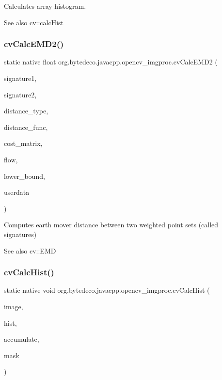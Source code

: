 Calculates array histogram. 

\begin{DoxySeeAlso}{See also}
cv\+::calc\+Hist 
\end{DoxySeeAlso}
\mbox{\label{group__imgproc__c_ga9960ba1e43fe6c47233d8e0d0c6a37f2}} 
\subsubsection{\texorpdfstring{cv\+Calc\+E\+M\+D2()}{cvCalcEMD2()}}
{\footnotesize\ttfamily static native float org.\+bytedeco.\+javacpp.\+opencv\+\_\+imgproc.\+cv\+Calc\+E\+M\+D2 (\begin{DoxyParamCaption}\item[{@Const Cv\+Arr}]{signature1,  }\item[{@Const Cv\+Arr}]{signature2,  }\item[{int}]{distance\+\_\+type,  }\item[{Cv\+Distance\+Function}]{distance\+\_\+func,  }\item[{@Const Cv\+Arr}]{cost\+\_\+matrix,  }\item[{Cv\+Arr}]{flow,  }\item[{Float\+Pointer}]{lower\+\_\+bound,  }\item[{Pointer}]{userdata }\end{DoxyParamCaption})\hspace{0.3cm}{\ttfamily [static]}}



Computes earth mover distance between two weighted point sets (called signatures) 

\begin{DoxySeeAlso}{See also}
cv\+::\+E\+MD 
\end{DoxySeeAlso}
\mbox{\label{group__imgproc__c_gacbc8dc98c5e08ad4a51431b276bd0044}} 
\subsubsection{\texorpdfstring{cv\+Calc\+Hist()}{cvCalcHist()}}
{\footnotesize\ttfamily static native void org.\+bytedeco.\+javacpp.\+opencv\+\_\+imgproc.\+cv\+Calc\+Hist (\begin{DoxyParamCaption}\item[{@Cast(\char`\"{}Ipl\+Image$\ast$$\ast$\char`\"{}) Pointer\+Pointer}]{image,  }\item[{Cv\+Histogram}]{hist,  }\item[{int}]{accumulate,  }\item[{@Const Cv\+Arr}]{mask }\end{DoxyParamCaption})\hspace{0.3cm}{\ttfamily [static]}}

